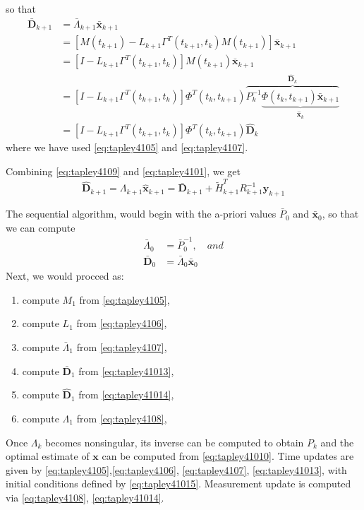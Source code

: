 so that
\begin{equation}
  \label{eq:tapley41013}
  \begin{aligned}
    \bar{\bm{D}}_{k+1} &= \bar{\Lambda}_{k+1} \bar{\bm{x}}_{k+1} \\
     & = \left[ M(t_{k+1}) - L_{k+1} \Gamma ^T (t_{k+1}, t_k ) M(t_{k+1}) \right] \bar{\bm{x}}_{k+1} \\
     & = \left[ I - L_{k+1} \Gamma ^T (t_{k+1}, t_k ) \right] M(t_{k+1}) \bar{\bm{x}}_{k+1} \\ 
     & = \left[ I - L_{k+1} \Gamma ^T (t_{k+1}, t_k ) \right] \Phi ^T (t_k, t_{k+1} ) \overbrace{P^{-1}_k \underbrace{\Phi (t_k, t_{k+1} ) \bar{\bm{x}}_{k+1}}_{\hat{\bm{x}}_k}}^{\hat{\bm{D}}_k} \\
     & = \left[ I - L_{k+1} \Gamma ^T (t_{k+1}, t_k ) \right] \Phi ^T (t_k, t_{k+1} ) \hat{\bm{D}}_k
  \end{aligned}
\end{equation}
where we have used \ref{eq:tapley4105} and \ref{eq:tapley4107}. 

Combining \ref{eq:tapley4109} and \ref{eq:tapley4101}, we get
\begin{equation}
  \label{eq:tapley41014}
  \hat{\bm{D}}_{k+1} = \Lambda_{k+1} \hat{\bm{x}}_{k+1} = 
    \bar{\bm{D}}_{k+1} + \tilde{H}^T_{k+1} R^{-1}_{k+1} \bm{y}_{k+1}
\end{equation}

The sequential algorithm, would begin with the a-priori values \(\bar{P}_0\) and 
\(\bar{\bm{x}}_0\), so that we can compute
\begin{subequations}
  \label{eq:tapley41015}
  \begin{align}
    \label{eq:tapley41015a}
    \bar{\Lambda}_0 &= \bar{P}^{-1}_0 , \quad and \\
    \label{eq:tapley41015b}
    \bar{\bm{D}}_0 & = \bar{\Lambda}_0 \bar{\bm{x}}_0
  \end{align}
\end{subequations}
Next, we would procced as:
\begin{enumerate}
  \item compute \(M_1\) from \ref{eq:tapley4105},
  \item compute \(L_1\) from \ref{eq:tapley4106},
  \item compute \(\bar{\Lambda} _1\) from \ref{eq:tapley4107},
  \item compute \(\bar{\bm{D}}_1\) from \ref{eq:tapley41013},
  \item compute \(\hat{\bm{D}}_1\) from \ref{eq:tapley41014},
  \item compute \(\Lambda _1\) from \ref{eq:tapley4108},
\end{enumerate}
Once \(\Lambda _k\) becomes nonsingular, its inverse can be computed to obtain 
\(P_k\) and the optimal estimate of \(\bm{x}\) can be computed from 
\ref{eq:tapley41010}. Time updates are given by \ref{eq:tapley4105},\ref{eq:tapley4106}, \ref{eq:tapley4107}, \ref{eq:tapley41013}, with initial conditions defined by 
\ref{eq:tapley41015}. Measurement update is computed via \ref{eq:tapley4108}, 
\ref{eq:tapley41014}.

